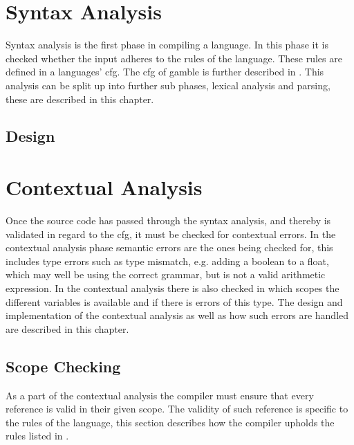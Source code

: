 

\chapter{Syntax Analysis}\label{sec:syntaxAnalysis}
Syntax analysis is the first phase in compiling a language.
In this phase it is checked whether the input adheres to the rules of the language.
These rules are defined in a languages' \acrshort{cfg}.
The \acrshort{cfg} of \gls{gamble} is further described in .
This analysis can be split up into further sub phases, lexical analysis and parsing, these are described in this chapter.
\section{Design}









\chapter{Contextual Analysis}
Once the source code has passed through the syntax analysis, and thereby is validated in regard to the \acrshort{cfg}, it must be checked for contextual errors.
In the contextual analysis phase semantic errors are the ones being checked for, this includes type errors such as type mismatch, e.g. adding a boolean to a float, which may well be using the correct grammar, but is not a valid arithmetic expression.
In the contextual analysis there is also checked in which scopes the different variables is available and if there is errors of this type.
The design and implementation of the contextual analysis as well as how such errors are handled are described in this chapter.
%


\section{Scope Checking}
As a part of the contextual analysis the compiler must ensure that every reference is valid in their given scope.
The validity of such reference is specific to the rules of the language, this section describes how the compiler upholds the rules listed in .


